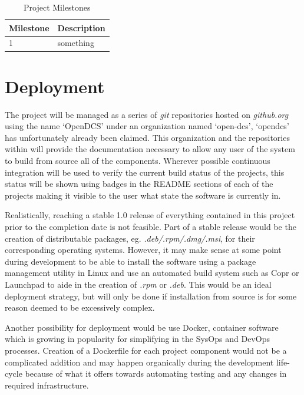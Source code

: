 \documentclass[11pt]{article}
\begin{document}
      \begin{table}[H]
        \centering
        \begin{tabular}{l | p{10cm}}
          \hline
          Milestone & Description \\ [0.5ex]
          \hline\hline
          1 & something \\
          \hline
        \end{tabular}
        \caption{Project Milestones}
        \label{tab:milestones}
      \end{table}

  \section{Deployment}\label{sec:deploy}

    The project will be managed as a series of \emph{git} repositories hosted
    on \emph{github.org} using the name `OpenDCS' under an organization named
    `open-dcs', `opendcs' has unfortunately already been claimed. This
    organization and the repositories within will provide the documentation
    necessary to allow any user of the system to build from source all of the
    components. Wherever possible continuous integration will be used to
    verify the current build status of the projects, this status will be shown
    using badges in the README sections of each of the projects making it
    visible to the user what state the software is currently in.

    Realistically, reaching a stable 1.0 release of everything contained in
    this project prior to the completion date is not feasible. Part of a
    stable release would be the creation of distributable packages, eg.
    \emph{.deb/.rpm/.dmg/.msi}, for their corresponding operating systems.
    However, it may make sense at some point during development to be able
    to install the software using a package management utility in Linux and use
    an automated build system such as Copr or Launchpad to aide in the creation
    of \emph{.rpm} or \emph{.deb}. This would be an ideal deployment strategy,
    but will only be done if installation from source is for some reason deemed
    to be excessively complex.

    Another possibility for deployment would be use Docker, container software
    which is growing in popularity for simplifying in the SysOps and DevOps
    processes. Creation of a Dockerfile for each project component would not
    be a complicated addition and may happen organically during the development
    life-cycle because of what it offers towards automating testing and any
    changes in required infrastructure.
\end{document}
